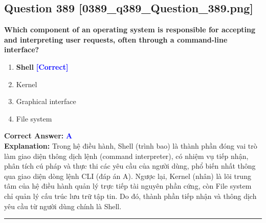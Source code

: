 \documentclass[11pt,a4paper]{article}
\begin{document}
\begin{minipage}{\textwidth}
\subsection*{Question 389 \quad \footnotesize{[0389\_q389\_Question\_389.png]}}
\noindent \textbf{Which component of an operating system is responsible for accepting and interpreting user requests, often through a command-line interface?}

\begin{enumerate}[label=\Alph*.]
    \item \textbf{Shell} \hfill \textcolor{blue}{\textbf{[Correct]}}
    \item Kernel
    \item Graphical interface
    \item File system
\end{enumerate}

\noindent \textbf{Correct Answer:} \textcolor{blue}{\textbf{A}} \\[2pt]
\noindent \textbf{Explanation:} Trong hệ điều hành, Shell (trình bao) là thành phần đóng vai trò làm giao diện thông dịch lệnh (command interpreter), có nhiệm vụ tiếp nhận, phân tích cú pháp và thực thi các yêu cầu của người dùng, phổ biến nhất thông qua giao diện dòng lệnh CLI (đáp án A). Ngược lại, Kernel (nhân) là lõi trung tâm của hệ điều hành quản lý trực tiếp tài nguyên phần cứng, còn File system chỉ quản lý cấu trúc lưu trữ tập tin. Do đó, thành phần tiếp nhận và thông dịch yêu cầu từ người dùng chính là Shell.

\par\vspace{0.3cm}
\hrule
\vspace{0.3cm}
\end{minipage}
\end{document}
